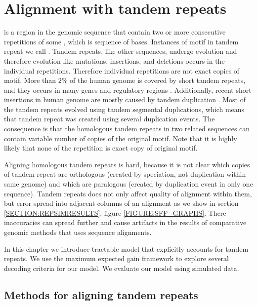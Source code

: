 \chapter{Alignment with tandem repeats}

 is a region in the genomic sequence that contain two
or more consecutive repetitions of some , which is sequence
of bases. Instances of motif in tandem repeat we call .
Tandem repeats, like other sequences, undergo evolution and therefore evolution
like mutations, insertions, and deletions occurs in the individual repetitions.
Therefore individual repetitions are not exact copies of motif. More than $2\%$
of the human genome is covered by short tandem repeats, and they occurs in many
genes and regulatory regions \cite{Gemayel2010}. Additionally, recent short
insertions in human genome are mostly caused by tandem duplication
\cite{Messer2007}. Most of the tandem repeats evolved using tandem segmental
duplications, which means that tandem repeat was created using several
duplication events. The consequence is that the homologous tandem repeats in
two related sequences can contain variable number of copies of the original
motif. Note that it is highly likely that none of the repetition is exact copy
of original motif.

Aligning homologous tandem repeats is hard, because it is not clear which
copies of tandem repeat are orthologous (created by speciation, not duplication
within same genome) and which are paralogous (created by duplication event in
only one sequence). Tandem repeats does not only affect quality of alignment
within them, but error spread into adjacent columns of an alignment as we show
in section \ref{SECTION:REPSIMRESULTS}, figure \ref{FIGURE:SFF_GRAPHS}.  There
inaccuracies can spread further and cause artifacts in the results of
comparative genomic methods that uses sequence alignments.

In this chapter we introduce tractable model that explicitly accounts for
tandem repeats. We use the maximum expected gain framework to explore several
decoding criteria for our model. We evaluate our model using simulated data. 
\section{Methods for aligning tandem repeats}\label{SECTION:REPALNMETHODS}

